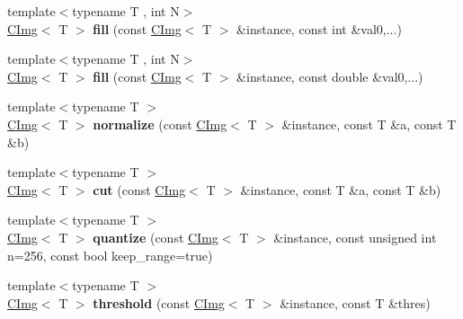 \begin{DoxyCompactItemize}
\item 
\hypertarget{namespacecimg__library_adf65cfcf4210edbdee95ebedadc51df4}{{\footnotesize template$<$typename T , int N$>$ }\\\hyperlink{structcimg__library_1_1_c_img}{C\-Img}$<$ T $>$ {\bfseries fill} (const \hyperlink{structcimg__library_1_1_c_img}{C\-Img}$<$ T $>$ \&instance, const int \&val0,...)}\label{namespacecimg__library_adf65cfcf4210edbdee95ebedadc51df4}

\item 
\hypertarget{namespacecimg__library_aa5faf88ddb91d95a8b3bb4326f515229}{{\footnotesize template$<$typename T , int N$>$ }\\\hyperlink{structcimg__library_1_1_c_img}{C\-Img}$<$ T $>$ {\bfseries fill} (const \hyperlink{structcimg__library_1_1_c_img}{C\-Img}$<$ T $>$ \&instance, const double \&val0,...)}\label{namespacecimg__library_aa5faf88ddb91d95a8b3bb4326f515229}

\item 
\hypertarget{namespacecimg__library_aeb922fcdf5e2a763859a09ad52725e99}{{\footnotesize template$<$typename T $>$ }\\\hyperlink{structcimg__library_1_1_c_img}{C\-Img}$<$ T $>$ {\bfseries normalize} (const \hyperlink{structcimg__library_1_1_c_img}{C\-Img}$<$ T $>$ \&instance, const T \&a, const T \&b)}\label{namespacecimg__library_aeb922fcdf5e2a763859a09ad52725e99}

\item 
\hypertarget{namespacecimg__library_a67aaa14c9923b42c65b3318f343fa56c}{{\footnotesize template$<$typename T $>$ }\\\hyperlink{structcimg__library_1_1_c_img}{C\-Img}$<$ T $>$ {\bfseries cut} (const \hyperlink{structcimg__library_1_1_c_img}{C\-Img}$<$ T $>$ \&instance, const T \&a, const T \&b)}\label{namespacecimg__library_a67aaa14c9923b42c65b3318f343fa56c}

\item 
\hypertarget{namespacecimg__library_a464871d819b33914678f1ce117a49265}{{\footnotesize template$<$typename T $>$ }\\\hyperlink{structcimg__library_1_1_c_img}{C\-Img}$<$ T $>$ {\bfseries quantize} (const \hyperlink{structcimg__library_1_1_c_img}{C\-Img}$<$ T $>$ \&instance, const unsigned int n=256, const bool keep\-\_\-range=true)}\label{namespacecimg__library_a464871d819b33914678f1ce117a49265}

\item 
\hypertarget{namespacecimg__library_a446bcc9062187651ee80c947ed8dcf25}{{\footnotesize template$<$typename T $>$ }\\\hyperlink{structcimg__library_1_1_c_img}{C\-Img}$<$ T $>$ {\bfseries threshold} (const \hyperlink{structcimg__library_1_1_c_img}{C\-Img}$<$ T $>$ \&instance, const T \&thres)}\label{namespacecimg__library_a446bcc9062187651ee80c947ed8dcf25}


\end{DoxyCompactItemize}
